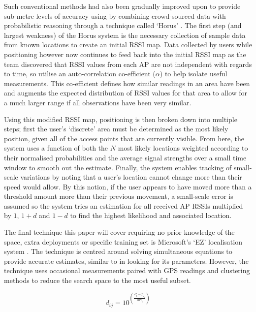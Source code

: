 \documentclass{UoYCSproject}
\begin{document}
                Such conventional methods had also been gradually improved upon to provide sub-metre levels of accuracy using by combining crowd-sourced data with probabilistic reasoning through a technique called `Horus' \citep{youssef2005horus}. The first step (and largest weakness) of the Horus system is the necessary collection of sample data from known locations to create an initial RSSI map. Data collected by users while positioning however now continues to feed back into the initial RSSI map as the team discovered that RSSI values from each AP are not independent with regards to time, so utilise an auto-correlation co-efficient ($\alpha$) to help isolate useful measurements. This co-efficient defines how similar readings in an area have been and augments the expected distribution of RSSI values for that area to allow for a much larger range if all observations have been very similar.
                
                Using this modified RSSI map, positioning is then broken down into multiple steps; first the user's `discrete' area must be determined as the most likely position, given all of the access points that are currently visible. From here, the system uses a function of both the $N$ most likely locations weighted according to their normalised probabilities and the average signal strengths over a small time window to smooth out the estimate. Finally, the system enables tracking of small-scale variations by noting that a user's location cannot change more than their speed would allow. By this notion, if the user appears to have moved more than a threshold amount more than their previous movement, a small-scale error is assumed so the system tries an estimation for all received AP RSSIs multiplied by $1$, $1+d$ and $1-d$ to find the highest likelihood and associated location.
                
                The final technique this paper will cover requiring no prior knowledge of the space, extra deployments or specific training set is Microsoft's `EZ' localisation system \citep{chintalapudi2010indoor}. The technique is centred around solving simultaneous equations to provide accurate estimates, similar to \citet{madigan2005bayesian} in looking for its parameters. However, the technique uses occasional measurements paired with GPS readings and clustering methods to reduce the search space to the most useful subset. 
                
                \begin{equation} \label{eq:EZdistance}
                    d_{ij} = 10^{\left(\frac{P_i - p_{ij}}{10\gamma_i}\right)}
                \end{equation}
                
\end{document}
